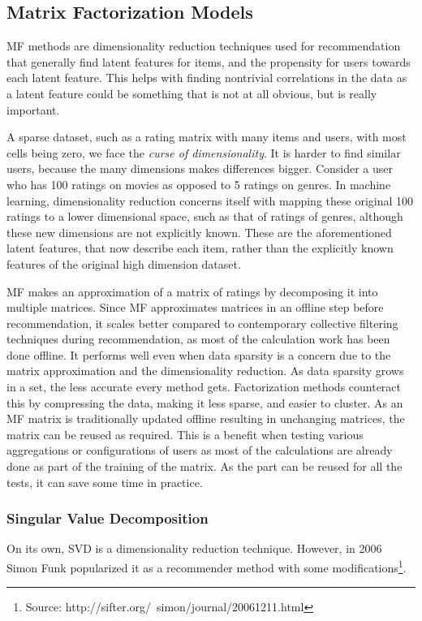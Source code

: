 \subsection{Matrix Factorization Models} \label{bg:sub:factorizationmodels}
MF methods are dimensionality reduction techniques used for recommendation that generally find latent features for items, and the propensity for users towards each latent feature. This helps with finding nontrivial correlations in the data as a latent feature could be something that is not at all obvious, but is really important.

A sparse dataset, such as a rating matrix with many items and users, with most cells being zero, we face the \textit{curse of dimensionality}. It is harder to find similar users, because the many dimensions makes differences bigger. Consider a user who has 100 ratings on movies as opposed to 5 ratings on genres. In machine learning, dimensionality reduction concerns itself with mapping these original 100 ratings to a lower dimensional space, such as that of ratings of genres, although these new dimensions are not explicitly known. These are the aforementioned latent features, that now describe each item, rather than the explicitly known features of the original high dimension dataset\cite{preprocessing}.

MF makes an approximation of a matrix of ratings by decomposing it into multiple matrices. Since MF approximates matrices in an offline step before recommendation, it scales better compared to contemporary collective filtering techniques during recommendation, as most of the calculation work has been done offline. It performs well even when data sparsity is a concern due to the matrix approximation and the dimensionality reduction.
As data sparsity grows in a set, the less accurate every method gets. Factorization methods counteract this by compressing the data, making it less sparse, and easier to cluster.
As an MF matrix is traditionally updated offline resulting in unchanging matrices, the matrix can be reused as required. This is a benefit when testing various aggregations or configurations of users as most of the calculations are already done as part of the training of the matrix. As the part can be reused for all the tests, it can save some time in practice.

\subsubsection{Singular Value Decomposition}
On its own, SVD is a dimensionality reduction technique. However, in 2006 Simon Funk popularized it as a recommender method with some modifications\footnote{Source: http://sifter.org/~simon/journal/20061211.html}\cite{svdsimonfunk}.

